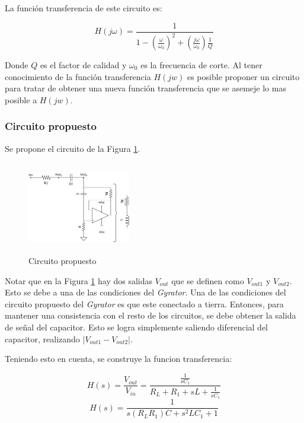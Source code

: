 \documentclass[12pt,a4paper]{article}
\begin{document}
La función transferencia de este circuito es:

\begin{equation} H(j\omega) = \frac{1}{1 - (\frac{\omega}{\omega_0})^{2} + (\frac{j\omega}{\omega_0})\frac{1}{Q}} \label{equ:trans_clasica_br}\end{equation}  

Donde $Q$ es el factor de calidad y $\omega_0$ es la frecuencia de corte.      
Al tener conocimiento de la función transferencia $H(jw)$ es posible proponer un circuito para tratar de obtener una nueva función transferencia que se asemeje lo mas posible a $H(jw)$. 

\subsubsection{Circuito propuesto}
Se propone el circuito de la Figura \ref{fig:ej2_LP_propuesto}. 

\begin{figure}[!]                                                       
\centering\includegraphics[width=0.4\textwidth, height=4cm]{Resources/ej2_lp_gyrator.png}
\caption{Circuito propuesto}
\label{fig:ej2_LP_propuesto}
\end{figure}


Notar que en la Figura  \ref{fig:ej2_LP_propuesto} hay dos salidas $V_{out}$ que se definen como $V_{out1}$ y $V_{out2}$. Esto se debe a  una de las condiciones del \textit{Gyrator}. Una de las condiciones del circuito propuesto del \textit{Gyrator} es que este conectado a tierra. Entonces, para mantener una consistencia con el resto de los circuitos, se debe obtener la salida de señal del capacitor. Esto se logra simplemente saliendo diferencial del capacitor, realizando $|V_{out1} - V_{out2}|$. 

Teniendo esto en cuenta, se construye la funcion transferencia:

\begin{displaymath} H(s)= \frac{V_{out}}{V_{in}} = \frac{\frac{1}{sC_1}}{R_L + R_1 +sL + \frac{1}{sC_1}} \end{displaymath}  
\begin{displaymath} H(s)= \frac{1}{s (R_L R_1)C + s^2LC_1 + 1} \end{displaymath}
\end{document}

